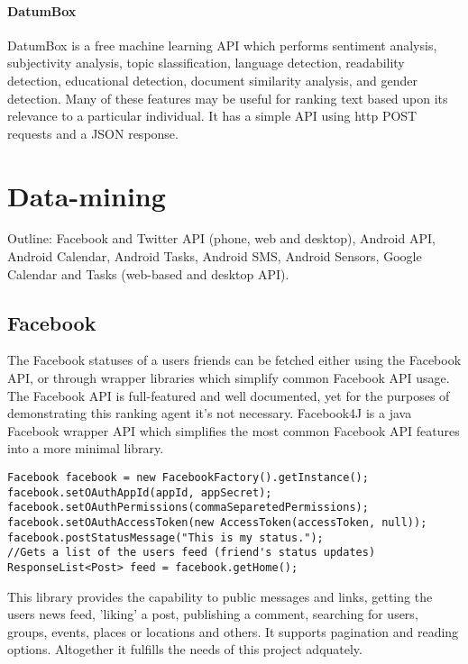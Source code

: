 \paragraph{DatumBox}
DatumBox is a free machine learning API which performs sentiment analysis, subjectivity analysis, topic slassification, language detection, readability detection, educational detection, document similarity analysis, and gender detection. Many of these features may be useful for ranking text based upon its relevance to a particular individual. It has a simple API using http POST requests and a JSON response. 

\section{Data-mining}

Outline: Facebook and Twitter API (phone, web and desktop), Android API, Android Calendar, Android Tasks, Android SMS, Android Sensors, Google Calendar and Tasks (web-based and desktop API).

\subsection{Facebook}
The Facebook statuses of a users friends can be fetched either using the Facebook API, or through wrapper libraries which simplify common Facebook API usage. The Facebook API is full-featured and well documented, yet for the purposes of demonstrating this ranking agent it's not necessary. 
Facebook4J is a java Facebook wrapper API which simplifies the most common Facebook API features into a more minimal library. 

\begin{lstlisting}
Facebook facebook = new FacebookFactory().getInstance();
facebook.setOAuthAppId(appId, appSecret);
facebook.setOAuthPermissions(commaSeparetedPermissions);
facebook.setOAuthAccessToken(new AccessToken(accessToken, null));
facebook.postStatusMessage("This is my status.");
//Gets a list of the users feed (friend's status updates)
ResponseList<Post> feed = facebook.getHome();
\end{lstlisting}


This library provides the capability to public messages and links, getting the users news feed, 'liking' a post, publishing a comment, searching for users, groups, events, places or locations and others. It supports pagination and reading options. Altogether it fulfills the needs of this project adquately. 


